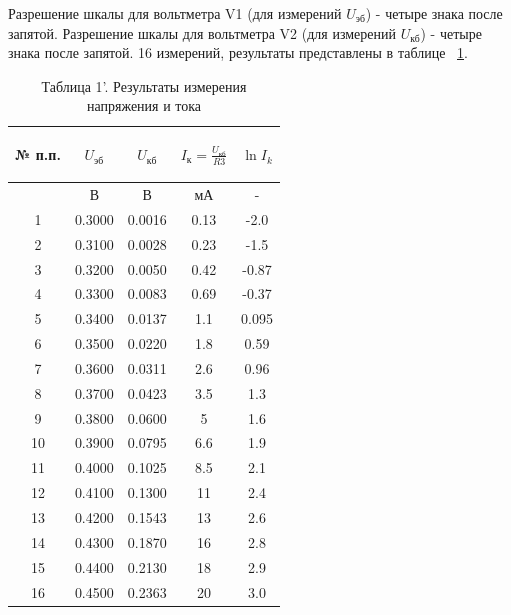 Разрешение шкалы для вольтметра V1 (для измерений $U_{\text{эб}}$) - четыре знака после запятой. Разрешение шкалы для вольтметра V2 (для измерений $U_{\text{кб}}$) - четыре знака после запятой. 16 измерений, результаты представлены в таблице ~\ref{tabl:1'}.
\begin{center}
\begin{table}[H]
\centering
\caption*{Таблица 1'. Результаты измерения напряжения и тока}
\label{tabl:1'}
\begin{tabular}{|c|c|c|c|c|}
\hline
\begin{minipage}{7mm}
    № п.п. 
\end{minipage}&
\begin{minipage}{3cm}
   \begin{center} $U_{\text{эб}}$ \end{center}
\end{minipage} &
\begin{minipage}{3cm}
   \begin{center} $U_{\text{кб}}$ \end{center}
\end{minipage} &
\begin{minipage}{3cm}
    \begin{center} $I_{\text{к}}=\frac{U_{\text{кб}}}{R3}$ \end{center}
\end{minipage}&
\begin{minipage}{3cm}
   \begin{center} $\ln I_k$ \end{center}
\end{minipage}\\
\hline
{}&В&В&мА&-\\
\hline
1 &  0.3000  &  0.0016  & 0.13  & -2.0 \\
2 &  0.3100  &  0.0028  & 0.23  & -1.5\\
3 &  0.3200  &  0.0050  & 0.42  & -0.87\\
4 & 0.3300  &  0.0083  & 0.69  & -0.37\\
5 & 0.3400  &  0.0137  &  1.1 & 0.095\\
6 & 0.3500  &  0.0220  &  1.8 & 0.59\\
7 & 0.3600  &  0.0311  &  2.6 & 0.96\\
8 & 0.3700  &  0.0423  &  3.5 & 1.3\\
9& 0.3800  &  0.0600 &  5 &  1.6\\
10 &  0.3900 &  0.0795  &  6.6 & 1.9 \\
11 &  0.4000  &  0.1025  &  8.5 & 2.1\\
12 &  0.4100  & 0.1300 &  11 & 2.4\\
13 & 0.4200 &  0.1543  &  13 & 2.6\\
14 & 0.4300  &  0.1870  &  16 & 2.8\\
15 & 0.4400  &  0.2130  &  18 & 2.9\\
16 & 0.4500  &  0.2363  &  20 & 3.0\\
\hline
\end{tabular}
\end{table}
\end{center}
